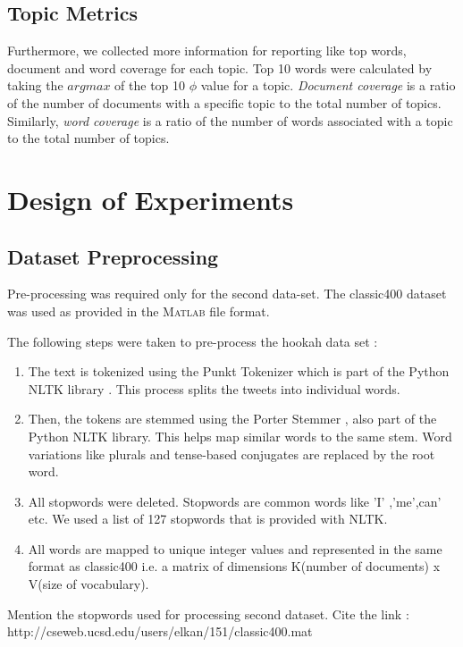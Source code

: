 \documentclass[11pt,a4paper,oneside]{article}
\begin{document}
\subsection{Topic Metrics}
Furthermore, we collected more information for reporting like top words, document and word coverage for each topic. Top 10 words were calculated by taking the $argmax$ of the top 10 $\phi$ value for a topic. \textit{Document coverage} is a ratio of the number of documents with a specific topic to the total number of topics. Similarly, \textit{word coverage} is a ratio of the number of words associated with a topic to the total number of topics.

\section{Design of Experiments}
\label{sec:Experiments}

\subsection{Dataset Preprocessing}
Pre-processing was required only for the second data-set. The classic400 dataset was used as provided in the \textsc{Matlab} file format.

The following steps were taken to pre-process the hookah data set : 

\begin{enumerate}
  \item The text is tokenized using the Punkt Tokenizer \cite{punkt} which is part of the Python NLTK library \cite{nltk}. This process splits the tweets into individual words.
  \item Then, the tokens are stemmed using the Porter Stemmer \cite{porter}, also part of the Python NLTK library. This helps map similar words to the same stem. Word variations like plurals and tense-based conjugates are replaced by the root word.
  \item All stopwords were deleted. Stopwords are common words like 'I' ,'me',can' etc. We used a list of 127 stopwords that is provided with NLTK\cite{nltk}.
  \item All words are mapped to unique integer values and represented in the same format as classic400 i.e. a matrix of dimensions K(number of documents) x V(size of vocabulary).
\end{enumerate}

Mention the stopwords used for processing second dataset.
Cite the link : http://cseweb.ucsd.edu/users/elkan/151/classic400.mat
\end{document}
